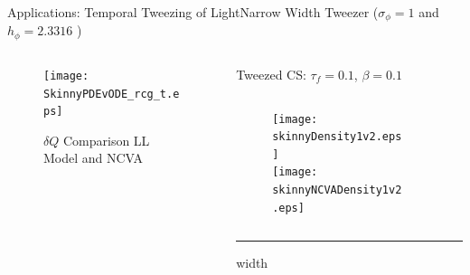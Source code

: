 \begin{frame}[c]{Applications: Temporal Tweezing of Light}{\textcolor{paleblue}{Narrow Width Tweezer} ($\sigma_\phi = 1$ and $h_\phi  = 2.3316$ )}

\begin{columns}

\begin{column}{0.28\textwidth}

\vspace{-7em}
\hskip -0.5cm \begin{framed}
\vspace{-1em}
\begin{figure}[h]
\centering
\centerline{
\texttt{[image: SkinnyPDEvODE\_rcg\_t.eps]}\hspace*{0.2cm}}

\caption{\tiny $\delta Q$ Comparison LL Model and NCVA}
\end{figure}
\vspace{-1.5em}
\end{framed}
\end{column}
\vrule width 1pt

\begin{column}{0.75\textwidth}
\vspace{-0.5em}
\centering
{\small Tweezed CS:  $\tau_f =0.1$, $\beta = 0.1$ }
\vspace{0.5em}
\begin{columns}
\begin{column}{0.5\textwidth}
\vspace{-1em}
\begin{figure}
\hspace{2em}\texttt{[image: skinnyDensity1v2.eps]}  \\
\vspace{-0.5em}
\hspace{2em}\texttt{[image: skinnyNCVADensity1v2.eps]} 
\end{figure}
\end{column}
\begin{column}{0.5\textwidth}
\vspace{-0.5em} \raggedright
\hspace{-2em}%
\end{column}
\end{columns}
\vspace{0.5em}
\hrule width\textwidth 


\end{column}
\end{columns}
\end{frame}
